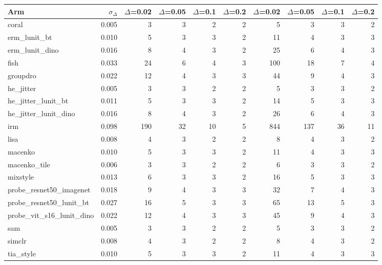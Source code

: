 \begin{tabular}{lrrrrrrrrr}
\toprule
Arm & $\sigma_\Delta$ & $\Delta$=0.02 & $\Delta$=0.05 & $\Delta$=0.1 & $\Delta$=0.2 & $\Delta$=0.02 & $\Delta$=0.05 & $\Delta$=0.1 & $\Delta$=0.2 \\
\midrule
coral & 0.005 & 3 & 3 & 2 & 2 & 5 & 3 & 3 & 2 \\
erm\_lunit\_bt & 0.010 & 5 & 3 & 3 & 2 & 11 & 4 & 3 & 3 \\
erm\_lunit\_dino & 0.016 & 8 & 4 & 3 & 2 & 25 & 6 & 4 & 3 \\
fish & 0.033 & 24 & 6 & 4 & 3 & 100 & 18 & 7 & 4 \\
groupdro & 0.022 & 12 & 4 & 3 & 3 & 44 & 9 & 4 & 3 \\
he\_jitter & 0.005 & 3 & 3 & 2 & 2 & 5 & 3 & 3 & 2 \\
he\_jitter\_lunit\_bt & 0.011 & 5 & 3 & 3 & 2 & 14 & 5 & 3 & 3 \\
he\_jitter\_lunit\_dino & 0.016 & 8 & 4 & 3 & 2 & 26 & 6 & 4 & 3 \\
irm & 0.098 & 190 & 32 & 10 & 5 & 844 & 137 & 36 & 11 \\
lisa & 0.008 & 4 & 3 & 2 & 2 & 8 & 4 & 3 & 2 \\
macenko & 0.010 & 5 & 3 & 3 & 2 & 11 & 4 & 3 & 3 \\
macenko\_tile & 0.006 & 3 & 3 & 2 & 2 & 6 & 3 & 3 & 2 \\
mixstyle & 0.013 & 6 & 3 & 3 & 2 & 16 & 5 & 3 & 3 \\
probe\_resnet50\_imagenet & 0.018 & 9 & 4 & 3 & 3 & 32 & 7 & 4 & 3 \\
probe\_resnet50\_lunit\_bt & 0.027 & 16 & 5 & 3 & 3 & 65 & 13 & 5 & 3 \\
probe\_vit\_s16\_lunit\_dino & 0.022 & 12 & 4 & 3 & 3 & 45 & 9 & 4 & 3 \\
sam & 0.005 & 3 & 3 & 2 & 2 & 5 & 3 & 3 & 2 \\
simclr & 0.008 & 4 & 3 & 2 & 2 & 8 & 4 & 3 & 2 \\
tia\_style & 0.010 & 5 & 3 & 3 & 2 & 11 & 4 & 3 & 3 \\
\bottomrule
\end{tabular}

